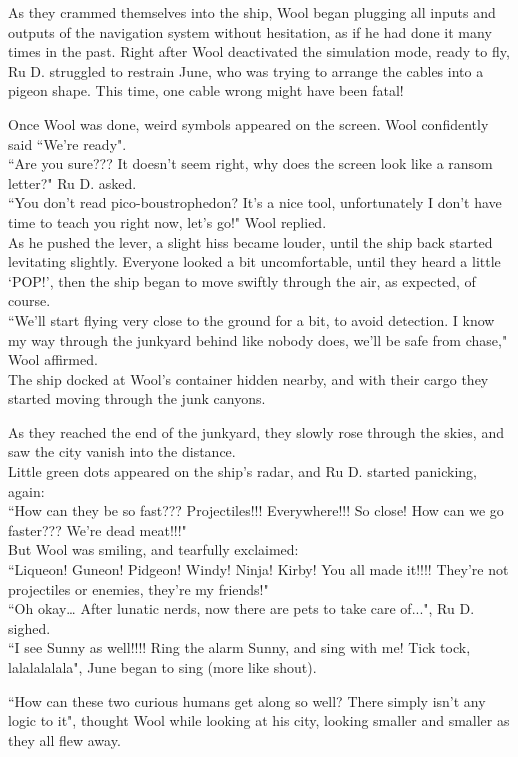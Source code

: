 As they crammed themselves into the ship, Wool began plugging all inputs and outputs of the navigation system without hesitation, as if he had done it many times in the past.
Right after Wool deactivated the simulation mode, ready to fly, Ru D. struggled to restrain June, who was trying to arrange the cables into a pigeon shape. This time, one cable wrong might have been fatal! 

Once Wool was done, weird symbols appeared on the screen. Wool confidently said ``We're ready".\\
``Are you sure??? It doesn't seem right, why does the screen look like a ransom letter?" Ru D. asked.\\
``You don't read pico-boustrophedon? It's a nice tool, unfortunately I don't have time to teach you right now, let's go!" Wool replied.\\
As he pushed the lever, a slight hiss became louder, until the ship back started levitating slightly. Everyone looked a bit uncomfortable, until they heard a little `POP!', then the ship began to move swiftly through the air, as expected, of course.\\
``We'll start flying very close to the ground for a bit, to avoid detection. I know my way through the junkyard behind like nobody does, we'll be safe from chase," Wool affirmed.\\
The ship docked at Wool's container hidden nearby, and with their cargo they started moving through the junk canyons.

As they reached the end of the junkyard, they slowly rose through the skies, and saw the city vanish into the distance.\\
Little green dots appeared on the ship's radar, and Ru D. started panicking, again:\\
``How can they be so fast??? Projectiles!!! Everywhere!!! So close! How can we go faster??? We’re dead meat!!!"\\
But Wool was smiling, and tearfully exclaimed:\\
``Liqueon! Guneon! Pidgeon! Windy! Ninja! Kirby! You all made it!!!! They’re not projectiles or enemies, they’re my friends!" \\
``Oh okay… After lunatic nerds, now there are pets to take care of...", Ru D. sighed.\\
``I see Sunny as well!!!! Ring the alarm Sunny, and sing with me! Tick tock, lalalalalala", June began to sing (more like shout).


``How can these two curious humans get along so well? There simply isn't any logic to it", thought Wool while looking at his city, looking smaller and smaller as they all flew away.